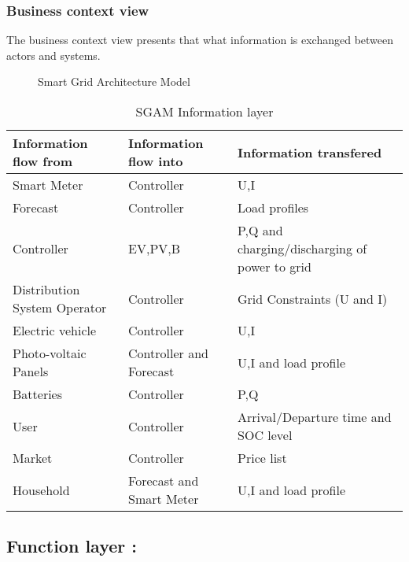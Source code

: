 \documentclass{article}
\begin{document}
\subsubsection{Business context view}
The business context view presents that what information is exchanged between actors and systems. 
\begin{figure}[h!b]
	\centering
	\caption{Smart Grid Architecture Model }
	\label{fig:Smart Grid Architecture Model }
\end{figure}
\begin{table}[h!b]
	\centering
	\begin{tabular} { | l | p{2.5cm} | l | }
		\hline
		\textbf{Information flow from} & \textbf{Information flow into} & \textbf{Information transfered} \\ 
		\hline
		Smart Meter & Controller & U,I \\ 
		\hline
		Forecast & Controller &  Load profiles \\ 
		\hline
		Controller & EV,PV,B & P,Q and charging/discharging of power to grid \\ 
		\hline
		Distribution System Operator & Controller  &  Grid Constraints (U and I) \\ 
		\hline
		Electric vehicle & Controller & U,I \\
		\hline
		Photo-voltaic Panels & Controller and Forecast & U,I and load profile  \\ 
		\hline
		Batteries & Controller & P,Q \\
		\hline
		User & Controller & Arrival/Departure time and SOC level \\ 
		\hline
		Market & Controller & Price list \\
		\hline
		Household & Forecast and Smart Meter & U,I and load profile \\ 
		\hline
	\end{tabular}
	\caption{SGAM Information layer}
	\label{table:5} 
\end{table}

\subsection{Function layer :} 
\end{document}
